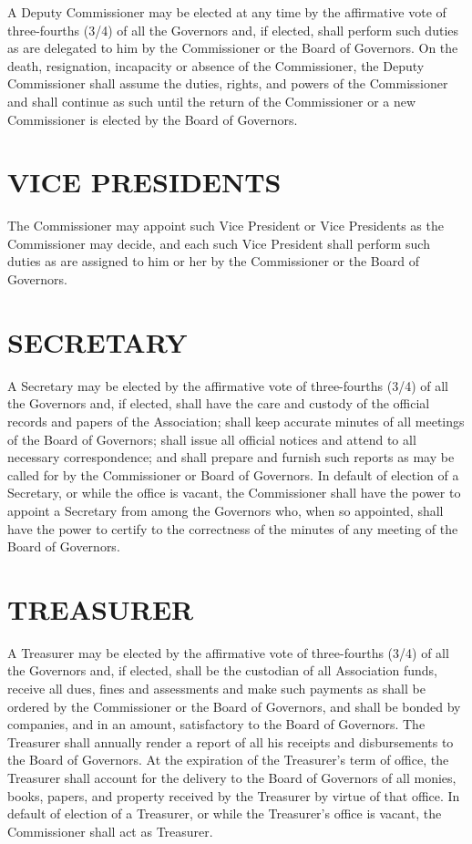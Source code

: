 \documentclass[]{book}
\begin{document}
A Deputy Commissioner may be elected at any time by the affirmative vote of three-fourths (3/4) of all the Governors and, if elected, shall perform such duties as are delegated to him by the Commissioner or the Board of Governors. On the death, resignation, incapacity or absence of the Commissioner, the Deputy Commissioner shall assume the duties, rights, and powers of the Commissioner and shall continue as such until the return of the Commissioner or a new Commissioner is elected by the Board of Governors.

\hypertarget{vice-presidents}{%
\section{VICE PRESIDENTS}\label{vice-presidents}}

The Commissioner may appoint such Vice President or Vice Presidents as the Commissioner may decide, and each such Vice President shall perform such duties as are assigned to him or her by the Commissioner or the Board of Governors.

\hypertarget{secretary}{%
\section{SECRETARY}\label{secretary}}

A Secretary may be elected by the affirmative vote of three-fourths (3/4) of all the Governors and, if elected, shall have the care and custody of the official records and papers of the Association; shall keep accurate minutes of all meetings of the Board of Governors; shall issue all official notices and attend to all necessary correspondence; and shall prepare and furnish such reports as may be called for by the Commissioner or Board of Governors. In default of election of a Secretary, or while the office is vacant, the Commissioner shall have the power to appoint a Secretary from among the Governors who, when so appointed, shall have the power to certify to the correctness of the minutes of any meeting of the Board of Governors.

\hypertarget{treasurer}{%
\section{TREASURER}\label{treasurer}}

A Treasurer may be elected by the affirmative vote of three-fourths (3/4) of all the Governors and, if elected, shall be the custodian of all Association funds, receive all dues, fines and assessments and make such payments as shall be ordered by the Commissioner or the Board of Governors, and shall be bonded by companies, and in an amount, satisfactory to the Board of Governors. The Treasurer shall annually render a report of all his receipts and disbursements to the Board of Governors. At the expiration of the Treasurer's term of office, the Treasurer shall account for the delivery to the Board of Governors of all monies, books, papers, and property received by the Treasurer by virtue of that office. In default of election of a Treasurer, or while the Treasurer's office is vacant, the Commissioner shall act as Treasurer.
\end{document}
